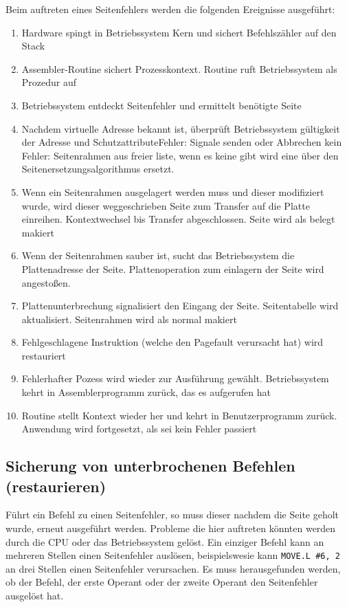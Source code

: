Beim auftreten eines Seitenfehlers werden die folgenden Ereignisse aus\-ge\-führt:

\begin{enumerate}
    \item Hardware spingt in Betriebssystem Kern und sichert Befehlszähler auf den Stack
    \item Assembler-Routine sichert Prozesskontext. Routine ruft Be\-triebs\-sys\-tem als Prozedur auf
    \item Betriebssystem entdeckt Seitenfehler und ermittelt benötigte Seite
    \item Nachdem virtuelle Adresse bekannt ist, überprüft Betriebssystem gül\-tig\-keit der Adresse und Schutzattribute\newline Fehler: Signale senden oder Abbrechen \newline kein Fehler: Seitenrahmen aus freier liste, wenn es keine gibt wird eine über den Seitenersetzungsalgorithmus ersetzt.
    \item Wenn ein Seitenrahmen ausgelagert werden muss und dieser modifiziert wurde, wird dieser weggeschrieben Seite zum Transfer auf die Platte einreihen. Kontextwechsel bis Transfer abgeschlossen. Seite wird als belegt makiert
    \item Wenn der Seitenrahmen sauber ist, sucht das Betriebssystem die Platt\-en\-ad\-res\-se der Seite. Plattenoperation zum einlagern der Seite wird angestoßen. 
    \item Plattenunterbrechung signalisiert den Eingang der Seite. Seitentabelle wird aktualisiert. Seitenrahmen wird als normal makiert
    \item Fehlgeschlagene Instruktion (welche den Pagefault verursacht hat) wird restauriert
    \item Fehlerhafter Pozess wird wieder zur Ausführung gewählt. Be\-triebs\-sys\-tem kehrt in Assemblerprogramm zurück, das es aufgerufen hat
    \item Routine stellt Kontext wieder her und kehrt in Benutzerprogramm zurück. Anwendung wird fortgesetzt, als sei kein Fehler passiert
\end{enumerate}

\subsection{Sicherung von unterbrochenen Befehlen (restaurieren)}

Führt ein Befehl zu einen Seitenfehler, so muss dieser nachdem die Seite geholt wurde, erneut ausgeführt werden. Probleme die hier auftreten könnten werden durch die CPU oder das Betriebssystem gelöst. Ein einziger Befehl kann an mehreren Stellen einen Seitenfehler auslösen, beispielswesie kann \texttt{MOVE.L \#6, 2} an drei Stellen einen Seitenfehler verursachen. Es muss herausgefunden werden, ob der Befehl, der erste Operant oder der zweite Operant den Seitenfehler ausgelöst hat.

